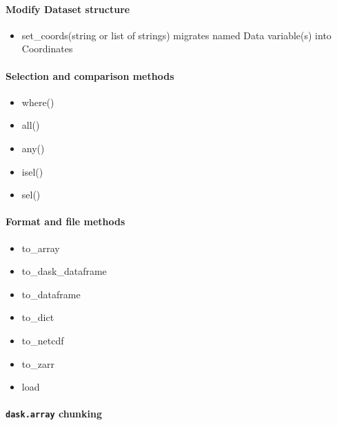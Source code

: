 \documentclass[11pt]{article}
\providecommand{\tightlist}{%
      \setlength{\itemsep}{0pt}\setlength{\parskip}{0pt}}
\begin{document}
    \hypertarget{modify-dataset-structure}{%
\paragraph{Modify Dataset structure}\label{modify-dataset-structure}}

\begin{itemize}
\tightlist
\item
  set\_coords(string or list of strings) migrates named Data variable(s)
  into Coordinates
\end{itemize}

\hypertarget{selection-and-comparison-methods}{%
\paragraph{Selection and comparison
methods}\label{selection-and-comparison-methods}}

\begin{itemize}
\tightlist
\item
  where()
\item
  all()
\item
  any()
\item
  isel()
\item
  sel()
\end{itemize}

\hypertarget{format-and-file-methods}{%
\paragraph{Format and file methods}\label{format-and-file-methods}}

\begin{itemize}
\tightlist
\item
  to\_array
\item
  to\_dask\_dataframe
\item
  to\_dataframe
\item
  to\_dict
\item
  to\_netcdf
\item
  to\_zarr
\item
  load
\end{itemize}

\hypertarget{dask.array-chunking}{%
\paragraph{\texorpdfstring{\texttt{dask.array}
chunking}{dask.array chunking}}\label{dask.array-chunking}}
\end{document}
